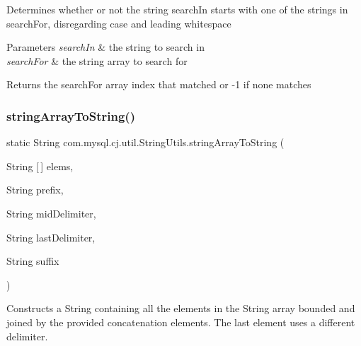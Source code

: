 Determines whether or not the string \textquotesingle{}search\+In\textquotesingle{} starts with one of the strings in \textquotesingle{}search\+For\textquotesingle{}, disregarding case and leading whitespace


\begin{DoxyParams}{Parameters}
{\em search\+In} & the string to search in \\
\hline
{\em search\+For} & the string array to search for\\
\hline
\end{DoxyParams}
\begin{DoxyReturn}{Returns}
the \textquotesingle{}search\+For\textquotesingle{} array index that matched or -\/1 if none matches 
\end{DoxyReturn}
\mbox{\label{classcom_1_1mysql_1_1cj_1_1util_1_1_string_utils_affd9db31d705e4eb839d18f08564459a}} 
\subsubsection{\texorpdfstring{string\+Array\+To\+String()}{stringArrayToString()}}
{\footnotesize\ttfamily static String com.\+mysql.\+cj.\+util.\+String\+Utils.\+string\+Array\+To\+String (\begin{DoxyParamCaption}\item[{String \mbox{[}$\,$\mbox{]}}]{elems,  }\item[{String}]{prefix,  }\item[{String}]{mid\+Delimiter,  }\item[{String}]{last\+Delimiter,  }\item[{String}]{suffix }\end{DoxyParamCaption})\hspace{0.3cm}{\ttfamily [static]}}

Constructs a String containing all the elements in the String array bounded and joined by the provided concatenation elements. The last element uses a different delimiter.


